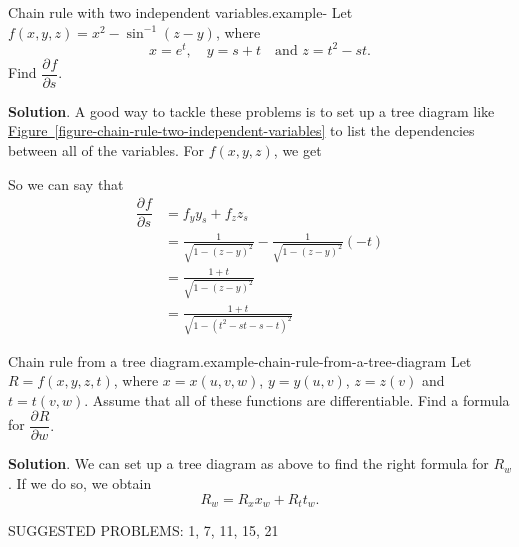 \documentclass[10pt,]{book}
\numberwithin{equation}{section}
\newcommand{\pdv}[3][]{\dfrac{\partial^{#1} #2}{\partial #3^{#1}}}
\begin{document}
\begin{example}{Chain rule with two independent variables.}{example-}%
\hypertarget{p-1390}{}%
Let \(f(x,y,z) = x^{2} - \sin^{-1}(z-y)\), where%
\begin{equation*}
x = e^{t}, \quad y = s + t\quad\text{and } z = t^{2} - st.
\end{equation*}
Find \(\pdv{f}{s}\).%
\par\smallskip%
\noindent\textbf{Solution}.\hypertarget{solution-225}{}\quad%
\hypertarget{p-1391}{}%
A good way to tackle these problems is to set up a tree diagram like \hyperref[figure-chain-rule-two-independent-variables]{Figure~\ref{figure-chain-rule-two-independent-variables}} to list the dependencies between all of the variables. For \(f(x,y,z)\), we get \begin{figure}
\centering
{
}
\end{figure}
 So we can say that%
\begin{align*}
\pdv{f}{s} & = f_{y}y_{s} + f_{z}z_{s} \\
& = \frac{1}{\sqrt{1 - (z - y)^{2}}} - \frac{1}{\sqrt{1 - (z - y)^{2}}}(-t) \\
& = \frac{1 + t}{\sqrt{1 - (z - y)^{2}}} \\
& = \frac{1 + t}{\sqrt{1 - (t^{2} - st - s - t)^{2}}} 
\end{align*}
%
\end{example}
\begin{example}{Chain rule from a tree diagram.}{example-chain-rule-from-a-tree-diagram}%
\hypertarget{p-1392}{}%
Let \(R = f(x,y,z,t)\), where \(x = x(u,v,w)\), \(y = y(u, v)\), \(z = z(v)\) and \(t = t(v,w)\). Assume that all of these functions are differentiable. Find a formula for \(\pdv{R}{w}.\)%
\par\smallskip%
\noindent\textbf{Solution}.\hypertarget{solution-226}{}\quad%
\hypertarget{p-1393}{}%
We can set up a tree diagram as above to find the right formula for \(R_{w}\). If we do so, we obtain%
\begin{equation*}
R_{w} = R_{x}x_{w} + R_{t}t_{w}.
\end{equation*}
%
\end{example}
\hypertarget{p-1394}{}%
SUGGESTED PROBLEMS: 1, 7, 11, 15, 21%
%
%
\typeout{************************************************}
\typeout{************************************************}
%
\end{document}
